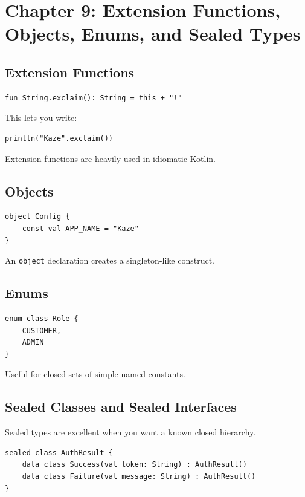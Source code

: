 \documentclass[11pt,a4paper]{article}
\begin{document}
\section{Chapter 9: Extension Functions, Objects, Enums, and Sealed Types}

\subsection{Extension Functions}

\begin{lstlisting}[style=kazekotlin]
fun String.exclaim(): String = this + "!"
\end{lstlisting}

This lets you write:

\begin{lstlisting}[style=kazekotlin]
println("Kaze".exclaim())
\end{lstlisting}

Extension functions are heavily used in idiomatic Kotlin.

\subsection{Objects}

\begin{lstlisting}[style=kazekotlin]
object Config {
    const val APP_NAME = "Kaze"
}
\end{lstlisting}

An \texttt{object} declaration creates a singleton-like construct.

\subsection{Enums}

\begin{lstlisting}[style=kazekotlin]
enum class Role {
    CUSTOMER,
    ADMIN
}
\end{lstlisting}

Useful for closed sets of simple named constants.

\subsection{Sealed Classes and Sealed Interfaces}

Sealed types are excellent when you want a known closed hierarchy.

\begin{lstlisting}[style=kazekotlin]
sealed class AuthResult {
    data class Success(val token: String) : AuthResult()
    data class Failure(val message: String) : AuthResult()
}
\end{lstlisting}
\end{document}
